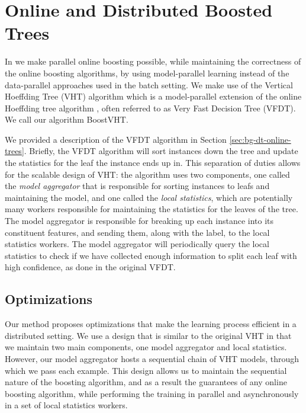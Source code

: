\section{Online and Distributed Boosted Trees}
\label{sec:boostvht-method}

In \boostvht we make parallel online boosting possible, while maintaining the
correctness of the online boosting algorithms, by using model-parallel learning
instead of the data-parallel approaches used in the batch setting.
We make use of the Vertical Hoeffding Tree (VHT) algorithm \cite{kourtellis2016vht} which is a model-parallel
extension of the online Hoeffding tree algorithm \cite{vfdt}, often referred to as
Very Fast Decision Tree (VFDT).
We call our algorithm BoostVHT.

We provided a description of the VFDT algorithm in Section \ref{sec:bg-dt-online-trees}.
Briefly, the VFDT algorithm will sort instances down the tree and update the statistics for the
leaf the instance ends up in. This separation of duties allows for the scalable design of
VHT: the algorithm uses two components, one called the \emph{model aggregator}
that is responsible for sorting instances to leafs and maintaining the model, and
one called the \emph{local statistics}, which are potentially many workers responsible
for maintaining the statistics for the leaves of the tree.
The model aggregator is responsible for breaking up each instance into its constituent
features, and sending them, along with the label, to the local statistics workers.
The model aggregator will periodically query the local statistics to check if we have
collected enough information to split each leaf with high confidence, as done in the
original VFDT.

\subsection*{Optimizations}

Our method proposes optimizations that make the learning process efficient in a distributed
setting. We use a design that is similar to the original VHT in that we maintain
two main components, one model aggregator and local statistics. However, our model
aggregator hosts a sequential chain of VHT models, through which we pass each example.
This design allows us to maintain the sequential nature of the boosting algorithm,
and as a result the guarantees of any online boosting algorithm, while performing
the training in parallel and asynchronously in a set of local statistics workers.

